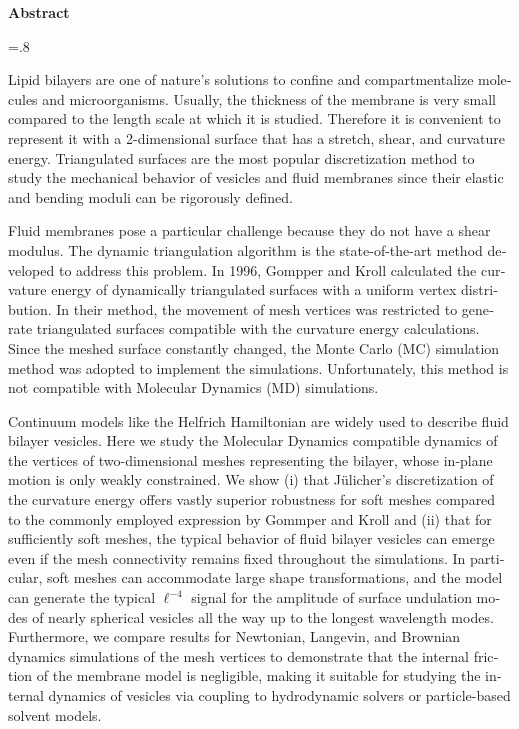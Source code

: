 


\pagestyle{empty}

\begin{latin}

\begin{center}
\textbf{Abstract}
\end{center}
\baselineskip=.8\baselineskip

Lipid bilayers are one of nature’s solutions to confine and compartmentalize molecules and microorganisms.  Usually, the thickness of the membrane is very small compared to the length scale at which it is studied. Therefore it is convenient to represent it with a 2-dimensional surface that has a stretch, shear, and curvature energy. Triangulated surfaces are the most popular discretization method to study the mechanical behavior of vesicles and fluid membranes since their elastic and bending moduli can be rigorously defined. 

Fluid membranes pose a particular challenge because they do not have a shear modulus. The dynamic triangulation algorithm is the state-of-the-art method developed to address this problem. In 1996, Gompper and Kroll calculated the curvature energy of dynamically triangulated surfaces with a uniform vertex distribution. In their method, the movement of mesh vertices was restricted to generate triangulated surfaces compatible with the curvature energy calculations. Since the meshed surface constantly changed, the Monte Carlo (MC) simulation method was adopted to implement the simulations. Unfortunately, this method is not compatible with Molecular Dynamics (MD) simulations.

Continuum models like the Helfrich Hamiltonian are widely used to describe fluid bilayer vesicles. 
Here we study the Molecular Dynamics compatible dynamics of the vertices of two-dimensional meshes representing the bilayer, whose in-plane motion is only weakly constrained.
We show 
(i) that J\"ulicher's discretization of the curvature energy offers vastly superior robustness for soft meshes compared to the commonly employed expression by Gommper and Kroll and 
(ii) that for sufficiently soft meshes, the typical behavior of fluid bilayer vesicles can emerge even if the mesh connectivity remains fixed throughout the simulations. 
In particular, soft meshes can accommodate large shape transformations, and the model can generate the typical $\ell^{-4}$ signal for the amplitude of surface undulation modes of nearly spherical vesicles all the way up to the longest wavelength modes.
Furthermore, we compare results for Newtonian, Langevin, and Brownian dynamics simulations of the mesh vertices to demonstrate that the internal friction of the membrane model is negligible, making it suitable for studying the internal dynamics of vesicles via coupling to hydrodynamic solvers or particle-based solvent models.



\end{latin}
